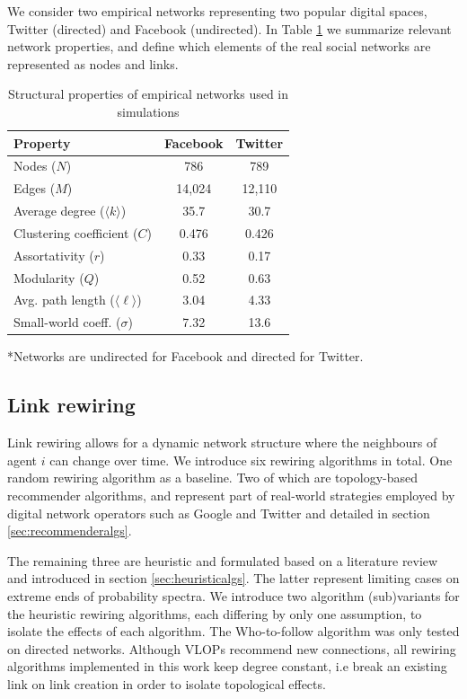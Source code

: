 \documentclass[unnumsec,webpdf,contemporary,large]{oup-authoring-template}%
\theoremstyle{thmstyleone}%
\theoremstyle{thmstyletwo}%
\theoremstyle{thmstylethree}%
\begin{document}
We consider two empirical networks representing two popular digital spaces, Twitter (directed) and Facebook (undirected). In Table \ref{tab:network_properties} we summarize relevant network properties, and define which elements of the real social networks are represented as nodes and links.

\begin{table}[!t]
\centering
\caption{Structural properties of empirical networks used in simulations}
\label{tab:network_properties}
\begin{tabular}{lcc}
\toprule
\textbf{Property} & \textbf{Facebook} & \textbf{Twitter} \\
\midrule
Nodes ($N$) & 786 & 789 \\
Edges ($M$) & 14,024 & 12,110 \\
Average degree ($\langle k \rangle$) & 35.7 & 30.7 \\
Clustering coefficient ($C$) & 0.476 & 0.426 \\
Assortativity ($r$) & 0.33 & 0.17 \\
Modularity ($Q$) & 0.52 & 0.63 \\
Avg. path length ($\langle \ell \rangle$) & 3.04 & 4.33 \\
Small-world coeff. ($\sigma$) & 7.32 & 13.6\\
\bottomrule
\end{tabular}
\vspace{2mm}
\par\noindent\footnotesize{*Networks are undirected for Facebook and directed for Twitter.}
\end{table}

\subsection{Link rewiring}\label{sec:linkrw}

Link rewiring allows for a dynamic network structure where the neighbours of agent \(i\) can change over time.  We introduce six rewiring algorithms in total. One random rewiring algorithm as a baseline. Two of which are topology-based recommender algorithms, and represent part of real-world strategies employed by digital network operators such as Google and Twitter \cite{gupta_wtf_2013} and detailed in section \ref{sec:recommenderalgs}.

The remaining three are heuristic and formulated based on a literature review and introduced in section \ref{sec:heuristicalgs}. The latter represent limiting cases on extreme ends of probability spectra. We introduce two algorithm (sub)variants for the heuristic rewiring algorithms, each differing by only one assumption, to isolate the effects of each algorithm. The Who-to-follow algorithm was only tested on directed networks. Although VLOPs recommend new connections, all rewiring algorithms implemented in this work keep degree constant, i.e break an existing link on link creation in order to isolate topological effects. 
\end{document}
